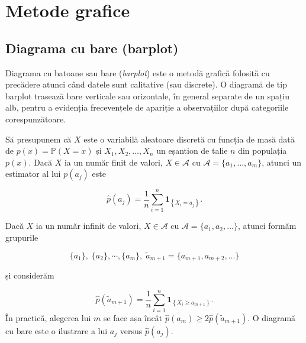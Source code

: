 \documentclass[]{article}
\newenvironment{Shaded}{\begin{snugshade}}{\end{snugshade}}
\newcommand{\KeywordTok}[1]{\textcolor[rgb]{0.13,0.29,0.53}{\textbf{#1}}}
\newcommand{\DecValTok}[1]{\textcolor[rgb]{0.00,0.00,0.81}{#1}}
\newcommand{\FloatTok}[1]{\textcolor[rgb]{0.00,0.00,0.81}{#1}}
\newcommand{\StringTok}[1]{\textcolor[rgb]{0.31,0.60,0.02}{#1}}
\newcommand{\OperatorTok}[1]{\textcolor[rgb]{0.81,0.36,0.00}{\textbf{#1}}}
\newcommand{\NormalTok}[1]{#1}
\begin{document}
\begin{Shaded}
\end{Shaded}

\section{Metode grafice}\label{metode-grafice}

\subsection{Diagrama cu bare (barplot)}\label{diagrama-cu-bare-barplot}

Diagrama cu batoane sau bare (\emph{barplot}) este o metodă grafică
folosită cu precădere atunci când datele sunt calitative (sau discrete).
O diagramă de tip barplot trasează bare verticale sau orizontale, în
general separate de un spațiu alb, pentru a evidenția frecevențele de
apariție a observațiilor după categoriile corespunzătoare.

Să presupunem că \(X\) este o variabilă aleatoare discretă cu funcția de
masă dată de \(p(x)=\mathbb{P}(X = x)\) și \(X_1, X_2, \ldots, X_n\) un
eșantion de talie \(n\) din populația \(p(x)\). Dacă \(X\) ia un număr
finit de valori, \(X\in\mathcal{A}\) cu
\(\mathcal{A} = \{a_1, \ldots, a_m\}\), atunci un estimator al lui
\(p(a_j)\) este

\[
  \hat{p}(a_j) = \frac{1}{n}\sum_{i = 1}^{n}\mathbf{1}_{\left\{X_i = a_j\right\}}.
\]

Dacă \(X\) ia un număr infinit de valori, \(X\in\mathcal{A}\) cu
\(\mathcal{A} = \{a_1, a_2, \ldots\}\), atunci formăm grupurile

\[
  \{a_1\}, \;\{a_2\},\cdots, \{a_m\},\; \tilde{a}_{m+1} = \{a_{m+1}, a_{m+2}, \ldots\}
\]

și considerăm

\[
  \hat{p}(\tilde{a}_{m+1}) = \frac{1}{n}\sum_{i = 1}^{n}\mathbf{1}_{\left\{X_i \geq a_{m+1}\right\}}.
\] În practică, alegerea lui \(m\) se face așa încât
\(\hat{p}(a_m)\geq 2\hat{p}(\tilde{a}_{m+1})\). O diagramă cu bare este
o ilustrare a lui \(a_j\) versus \(\hat{p}(a_j)\).
\end{document}
